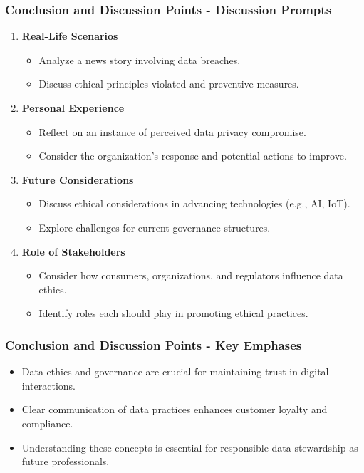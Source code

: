 \documentclass[aspectratio=169]{beamer}
\begin{document}
\begin{frame}[fragile]
    \frametitle{Conclusion and Discussion Points - Discussion Prompts}
    \begin{enumerate}
        \item \textbf{Real-Life Scenarios}
        \begin{itemize}
            \item Analyze a news story involving data breaches. 
            \item Discuss ethical principles violated and preventive measures.
        \end{itemize}

        \item \textbf{Personal Experience}
        \begin{itemize}
            \item Reflect on an instance of perceived data privacy compromise.
            \item Consider the organization's response and potential actions to improve.
        \end{itemize}

        \item \textbf{Future Considerations}
        \begin{itemize}
            \item Discuss ethical considerations in advancing technologies (e.g., AI, IoT).
            \item Explore challenges for current governance structures.
        \end{itemize}

        \item \textbf{Role of Stakeholders}
        \begin{itemize}
            \item Consider how consumers, organizations, and regulators influence data ethics.
            \item Identify roles each should play in promoting ethical practices.
        \end{itemize}
    \end{enumerate}
\end{frame}

\begin{frame}[fragile]
    \frametitle{Conclusion and Discussion Points - Key Emphases}
    \begin{itemize}
        \item Data ethics and governance are crucial for maintaining trust in digital interactions.
        \item Clear communication of data practices enhances customer loyalty and compliance.
        \item Understanding these concepts is essential for responsible data stewardship as future professionals.
    \end{itemize}
\end{frame}
\end{document}
